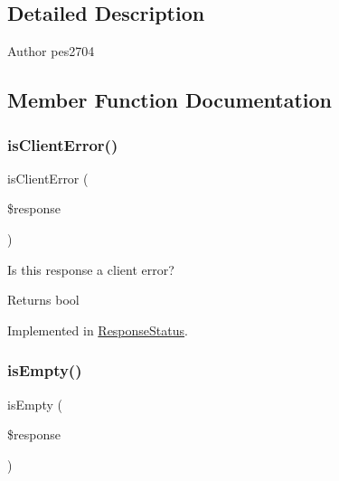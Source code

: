 \subsection{Detailed Description}
\begin{DoxyAuthor}{Author}
pes2704 
\end{DoxyAuthor}


\subsection{Member Function Documentation}
\mbox{\label{interface_pes_1_1_http_1_1_response_status_interface_a3f4db87c51272174be28176a2919633d}} 
\subsubsection{\texorpdfstring{is\+Client\+Error()}{isClientError()}}
{\footnotesize\ttfamily is\+Client\+Error (\begin{DoxyParamCaption}\item[{Response\+Interface}]{\$response }\end{DoxyParamCaption})}

Is this response a client error?

\begin{DoxyReturn}{Returns}
bool 
\end{DoxyReturn}


Implemented in \mbox{\hyperlink{class_pes_1_1_http_1_1_response_status_a3f4db87c51272174be28176a2919633d}{Response\+Status}}.

\mbox{\label{interface_pes_1_1_http_1_1_response_status_interface_a5166ac30ac60791ad8c30d76038b9371}} 
\subsubsection{\texorpdfstring{is\+Empty()}{isEmpty()}}
{\footnotesize\ttfamily is\+Empty (\begin{DoxyParamCaption}\item[{Response\+Interface}]{\$response }\end{DoxyParamCaption})}

